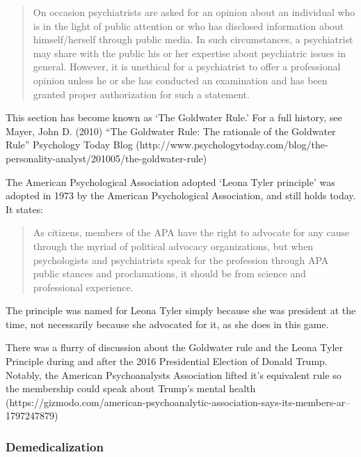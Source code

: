 \begin{refsection}
\begin{quote}

On occasion psychiatrists are asked for an opinion about an individual who is in the light of public attention or who has disclosed information about himself\slash herself through public media. In such circumstances, a psychiatrist may share with the public his or her expertise about psychiatric issues in general. However, it is unethical for a psychiatrist to offer a professional opinion unless he or she has conducted an examination and has been granted proper authorization for such a statement.
\end{quote}

This section has become known as `The Goldwater Rule.' For a full history, see Mayer, John D. (2010) “The Goldwater Rule: The rationale of the Goldwater Rule” Psychology Today Blog (http:\slash \slash www.psychologytoday.com\slash blog\slash the-personality-analyst\slash 201005\slash the-goldwater-rule)

The American Psychological Association adopted `Leona Tyler principle' was adopted in 1973 by the American Psychological Association, and still holds today. It states:

\begin{quote}

As citizens, members of the APA have the right to advocate for any cause through the myriad of political advocacy organizations, but when psychologists and psychiatrists speak for the profession through APA public stances and proclamations, it should be from science and professional experience. 
\end{quote}

The principle was named for Leona Tyler simply because she was president at the time, not necessarily because she advocated for it, as she does in this game. 

There was a flurry of discussion about the Goldwater rule and the Leona Tyler Principle during and after the 2016 Presidential Election of Donald Trump. Notably, the American Psychoanalysts Association lifted it's equivalent rule so the membership could speak about Trump's mental health (https:\slash \slash gizmodo.com\slash american-psychoanalytic-association-says-its-members-ar--1797247879)

\subsubsection{Demedicalization}
\label{demedicalization}


\end{refsection}
